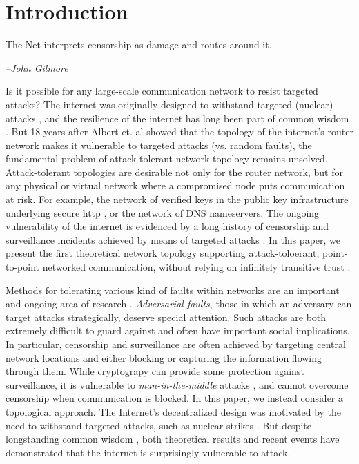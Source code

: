 \documentclass[10pt,letterpaper]{article}
\begin{document}
\linenumbers

\section*{Introduction}

\epigraph{The Net interprets censorship as damage and routes around it.}{\textit{--John Gilmore} \cite{elmer-dewitt_first_1993}}

Is it possible for any large-scale communication network to resist targeted
attacks?
The internet was originally designed to withstand targeted (nuclear) attacks
\cite{baran_distributed_1964},
and the resilience of the internet has long been part of common wisdom
\cite{elmer-dewitt_first_1993}.
But 18 years after Albert et. al \cite{albert_error_2000}
showed that the topology of the internet's router network
makes it vulnerable to targeted attacks
(vs. random faults), the fundamental problem of attack-tolerant network topology
remains unsolved.
Attack-tolerant topologies are desirable not only for the router network,
but for any physical or virtual network where a compromised node puts
communication at risk.
For example, the network of verified keys in the public key infrastructure
underlying secure http \cite{ellison_ten_2000},
or the network of DNS nameservers.
The ongoing vulnerability of the internet is evidenced by a long history of 
censorship and surveillance incidents achieved by means of targeted attacks
\cite{dainotti_analysis_2011}.
In this paper, we present the first theoretical network topology
supporting attack-toloerant, point-to-point networked communication,
without relying on infinitely transitive trust
\cite{christianson_why_1997}.

Methods for tolerating various kind of faults within networks are an
important and ongoing area of research
\cite{zin_survey_2015,albert_error_2000,sterbenz_resilience_2010}.
{\em Adversarial faults},
those in which an adversary can target attacks strategically,
deserve special attention.
Such attacks are both extremely difficult to guard against and 
often have important social implications.
In particular, censorship and surveillance are often achieved
by targeting central network locations and either blocking or capturing
the information flowing through them.
While cryptograpy can provide some protection against surveillance, it is
vulnerable to {\em man-in-the-middle} attacks \cite{nayak_different_2010},
and cannot overcome censorship when communication is blocked.
In this paper, we instead consider a topological approach.
The Internet's decentralized design was motivated
by the need to withstand targeted attacks, such as nuclear strikes
\cite{baran_distributed_1964}.
But despite longstanding common wisdom \cite{elmer-dewitt_first_1993},
both theoretical results and recent events
have demonstrated that the internet is surprisingly vulnerable to attack.
\end{document}
